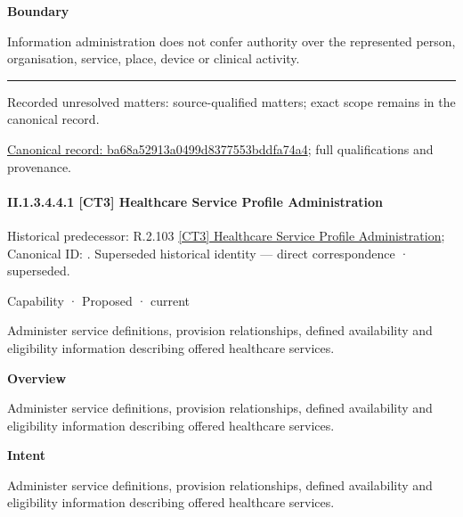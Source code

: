 \textbf{Boundary}



Information administration does not confer authority over the represented person, organisation, service, place, device or clinical activity.



\medskip\hrule\medskip

{\small Recorded unresolved matters: source-qualified matters; exact scope remains in the canonical record.}\par
{\footnotesize \href{../../../../continuum/strategy/capability/ba68a52913a0499d8377553bddfa74a4.md}{Canonical record: ba68a52913a0499d8377553bddfa74a4}; full qualifications and provenance.}\par
\paragraph*{II.1.3.4.4.1 [CT3] Healthcare Service Profile Administration}
\label{navigation:II.1.3.4.4.1}

{\small Historical predecessor: R.2.103 \hyperref[element:7780ca2fed2346439d5f559d00cc4ee4]{[CT3] Healthcare Service Profile Administration}; Canonical ID: \texttt{}. Superseded historical identity — direct correspondence · superseded.}\par
\label{element:e75d5eb30936476ea7a9cbadfa43d5ef}
{\small Capability · Proposed · current}\par

Administer service definitions, provision relationships, defined availability and eligibility information describing offered healthcare services.



\textbf{Overview}



Administer service definitions, provision relationships, defined availability and eligibility information describing offered healthcare services.



\textbf{Intent}



Administer service definitions, provision relationships, defined availability and eligibility information describing offered healthcare services.



